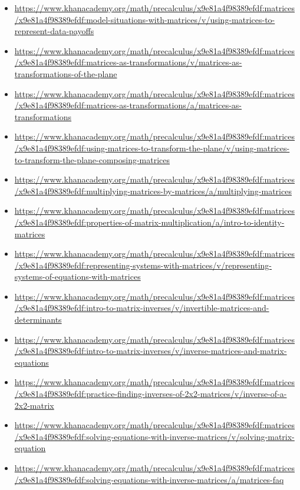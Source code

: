 \documentclass[12pt]{report}
\begin{document}
\begin{itemize}[left=0pt, topsep=0pt]
    \item \url{https://www.khanacademy.org/math/precalculus/x9e81a4f98389efdf:matrices/x9e81a4f98389efdf:model-situations-with-matrices/v/using-matrices-to-represent-data-payoffs}
    \item \url{https://www.khanacademy.org/math/precalculus/x9e81a4f98389efdf:matrices/x9e81a4f98389efdf:matrices-as-transformations/v/matrices-as-transformations-of-the-plane}
    \item \url{https://www.khanacademy.org/math/precalculus/x9e81a4f98389efdf:matrices/x9e81a4f98389efdf:matrices-as-transformations/a/matrices-as-transformations}
    \item \url{https://www.khanacademy.org/math/precalculus/x9e81a4f98389efdf:matrices/x9e81a4f98389efdf:using-matrices-to-transform-the-plane/v/using-matrices-to-transform-the-plane-composing-matrices}
    \item \url{https://www.khanacademy.org/math/precalculus/x9e81a4f98389efdf:matrices/x9e81a4f98389efdf:multiplying-matrices-by-matrices/a/multiplying-matrices}
    \item \url{https://www.khanacademy.org/math/precalculus/x9e81a4f98389efdf:matrices/x9e81a4f98389efdf:properties-of-matrix-multiplication/a/intro-to-identity-matrices}
    \item \url{https://www.khanacademy.org/math/precalculus/x9e81a4f98389efdf:matrices/x9e81a4f98389efdf:representing-systems-with-matrices/v/representing-systems-of-equations-with-matrices}
    \item \url{https://www.khanacademy.org/math/precalculus/x9e81a4f98389efdf:matrices/x9e81a4f98389efdf:intro-to-matrix-inverses/v/invertible-matrices-and-determinants}
    \item \url{https://www.khanacademy.org/math/precalculus/x9e81a4f98389efdf:matrices/x9e81a4f98389efdf:intro-to-matrix-inverses/v/inverse-matrices-and-matrix-equations}
    \item \url{https://www.khanacademy.org/math/precalculus/x9e81a4f98389efdf:matrices/x9e81a4f98389efdf:practice-finding-inverses-of-2x2-matrices/v/inverse-of-a-2x2-matrix}
    \item \url{https://www.khanacademy.org/math/precalculus/x9e81a4f98389efdf:matrices/x9e81a4f98389efdf:solving-equations-with-inverse-matrices/v/solving-matrix-equation}
    \item \url{https://www.khanacademy.org/math/precalculus/x9e81a4f98389efdf:matrices/x9e81a4f98389efdf:solving-equations-with-inverse-matrices/a/matrices-faq}

\end{itemize}
\end{document}
